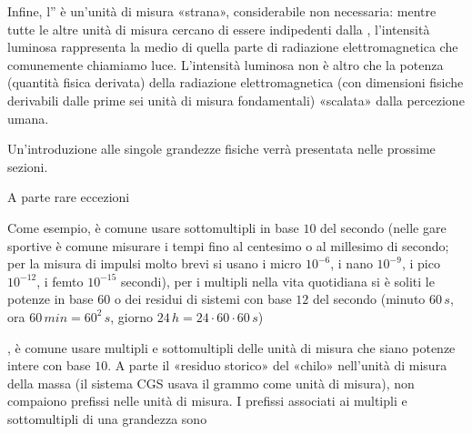 \documentclass[letterpaper,10pt,italian]{jupyterBook}
\begin{document}
\sphinxAtStartPar
Infine, l”{\hyperref[\detokenize{ch/intro/physical_quantities-luminosity:physics-hs-intro-physical-quantities-luminosity}]{}} è un’unità di misura «strana», considerabile non necessaria: mentre tutte le altre unità di misura cercano di essere indipedenti dalla {\hyperref[\detokenize{ch/intro/sensing:physics-hs-intro-sensing}]{}}, l’intensità luminosa rappresenta la  medio di quella parte di radiazione elettromagnetica che comunemente chiamiamo luce. L’intensità luminosa non è altro che la potenza (quantità fisica derivata) della radiazione elettromagnetica (con dimensioni fisiche derivabili dalle prime sei unità di misura fondamentali) «scalata» dalla percezione umana.

\sphinxAtStartPar
Un’introduzione alle singole grandezze fisiche verrà presentata nelle prossime sezioni.

\sphinxAtStartPar
{} A parte rare eccezioni%
\begin{footnote}[1]\sphinxAtStartFootnote
Come esempio, è comune usare sottomultipli in base \(10\) del secondo (nelle gare sportive è comune misurare i tempi fino al centesimo o al millesimo di secondo; per la misura di impulsi molto brevi si usano i micro \(10^{-6}\), i nano \(10^{-9}\), i pico \(10^{-12}\), i femto \(10^{-15}\) \sphinxhyphen{}secondi), per i multipli nella vita quotidiana si è soliti le potenze in base \(60\) \sphinxhyphen{} o dei residui di sistemi con base \(12\) \sphinxhyphen{} del secondo (minuto \(60 \, s\), ora \(60 \, min = 60^2 \, s\), giorno \(24 \, h = 24 \cdot 60 \cdot 60 \, s\))
%
\end{footnote}, è comune usare multipli e sottomultipli delle unità di misura che siano potenze intere con base \(10\). A parte il «residuo storico» del «chilo» nell’unità di misura della massa (il sistema CGS usava il grammo come unità di misura), non compaiono prefissi nelle unità di misura. I prefissi associati ai multipli e sottomultipli di una grandezza sono
\end{document}

